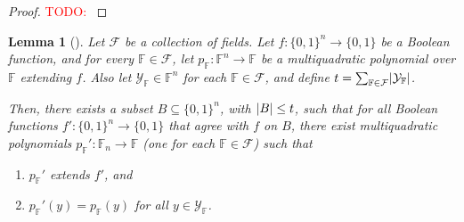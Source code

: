 \documentclass[english,12pt]{reedthesis}
\theoremstyle{plain}
\newtheorem{lemma}[lemma]{Lemma}
\theoremstyle{definition}
\theoremstyle{remark}
\DeclarePairedDelimiter{\abs}{\lvert}{\rvert}
\newcommand{\TODO}[1]{\textcolor{red}{TODO: #1}}
\begin{document}
\begin{proof}
  \TODO{}
\end{proof}

\begin{lemma}[{\cite[Lemma 4.5]{AW09}}]\label{lem:multiquad-adversary}
  Let $\mathcal{F}$ be a collection of fields. Let $f\colon \{0, 1\}^{n} \rightarrow \{0, 1\}$ be a
  Boolean function, and for every $\mathbb{F} \in \mathcal{F}$, let
  $p_{\mathbb{F}}\colon \mathbb{F}^{n} \rightarrow \mathbb{F}$ be a multiquadratic
  polynomial over $\mathbb{F}$ extending $f$. Also let
  $\mathcal{Y}_{\mathbb{F}} \in \mathbb{F}^{n}$ for each $\mathbb{F} \in \mathcal{F}$, and define
  $t = \sum_{\mathbb{F} \in \mathcal{F}}\abs{\mathcal{Y}_{\mathbb{F}}}$.

  Then, there exists a subset $B \subseteq \{0, 1\}^{n}$, with $\abs{B} \le t$, such that
  for all Boolean functions $f'\colon \{0, 1\}^{n} \rightarrow \{0, 1\}$ that agree with
  $f$ on $B$, there exist multiquadratic polynomials
  $p_{\mathbb{F}}'\colon \mathbb{F}_{n} \rightarrow \mathbb{F}$ (one for each
  $\mathbb{F} \in \mathcal{F}$) such that
  \begin{enumerate}
    \item $p_{\mathbb{F}}'$ extends $f'$, and
    \item $p_{\mathbb{F}}'(y) = p_{\mathbb{F}}(y)$ for all $y \in \mathcal{Y}_{\mathbb{F}}$.
  \end{enumerate}
\end{lemma}
\end{document}
